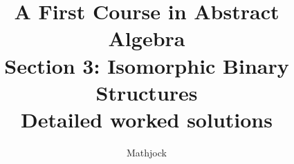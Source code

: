 
\title{\textbf{A First Course in Abstract Algebra}\\[0.3em]Section 3: Isomorphic Binary Structures\\[0.3em]\large Detailed worked solutions}
\author{Mathjock}
\date{}

\maketitle
\bookinfo
\tableofcontents
\clearpage
\renewcommand{\thesection}{3}
\renewcommand{\theHsection}{fraleigh.3}


